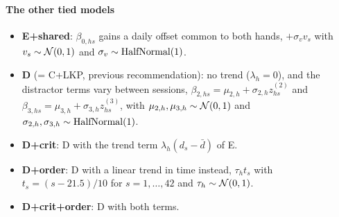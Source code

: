 \paragraph{The other tied models}
\begin{itemize}
\item \textbf{E+shared}: $\beta_{0,hs}$ gains a daily offset common to both hands, $+\sigma_v v_s$ with $v_s\sim\mathcal{N}(0,1)$ and $\sigma_v\sim\operatorname{HalfNormal}(1)$.
\item \textbf{D} (= C+LKP, previous recommendation): no trend ($\lambda_h=0$), and the distractor terms vary between sessions, $\beta_{2,hs}=\mu_{2,h}+\sigma_{2,h}z^{(2)}_{hs}$ and $\beta_{3,hs}=\mu_{3,h}+\sigma_{3,h}z^{(3)}_{hs}$, with $\mu_{2,h},\mu_{3,h}\sim\mathcal{N}(0,1)$ and $\sigma_{2,h},\sigma_{3,h}\sim\operatorname{HalfNormal}(1)$.
\item \textbf{D+crit}: D with the trend term $\lambda_h(d_s-\bar d)$ of E.
\item \textbf{D+order}: D with a linear trend in time instead, $\tau_h t_s$ with $t_s=(s-21.5)/10$ for $s=1,\dots,42$ and $\tau_h\sim\mathcal{N}(0,1)$.
\item \textbf{D+crit+order}: D with both terms.
\end{itemize}
